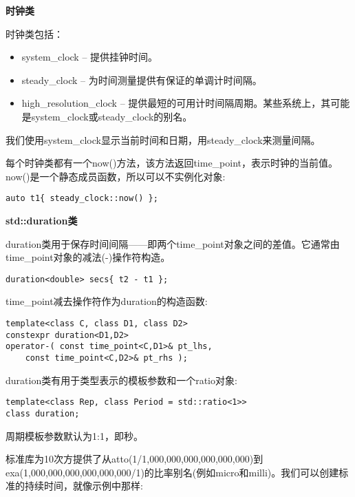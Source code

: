 \noindent
\textbf{时钟类}

时钟类包括：

\begin{itemize}
\item 
system\_clock – 提供挂钟时间。

\item 
steady\_clock – 为时间测量提供有保证的单调计时间隔。

\item 
high\_resolution\_clock – 提供最短的可用计时间隔周期。某些系统上，其可能是system\_clock或steady\_clock的别名。

\end{itemize}

我们使用system\_clock显示当前时间和日期，用steady\_clock来测量间隔。

每个时钟类都有一个now()方法，该方法返回time\_point，表示时钟的当前值。now()是一个静态成员函数，所以可以不实例化对象:

\begin{lstlisting}[style=styleCXX]
auto t1{ steady_clock::now() };
\end{lstlisting}

\noindent
\textbf{std::duration类}

duration类用于保存时间间隔——即两个time\_point对象之间的差值。它通常由time\_point对象的减法(-)操作符构造。

\begin{lstlisting}[style=styleCXX]
duration<double> secs{ t2 - t1 };
\end{lstlisting}

time\_point减去操作符作为duration的构造函数:

\begin{lstlisting}[style=styleCXX]
template<class C, class D1, class D2>
constexpr duration<D1,D2>
operator-( const time_point<C,D1>& pt_lhs,
	const time_point<C,D2>& pt_rhs );
\end{lstlisting}

duration类有用于类型表示的模板参数和一个ratio对象:

\begin{lstlisting}[style=styleCXX]
template<class Rep, class Period = std::ratio<1>>
class duration;
\end{lstlisting}

周期模板参数默认为1:1，即秒。

标准库为10次方提供了从atto(1/1,000,000,000,000,000,000)到exa(1,000,000,000,000,000,000/1)的比率别名(例如micro和milli)。我们可以创建标准的持续时间，就像示例中那样:

